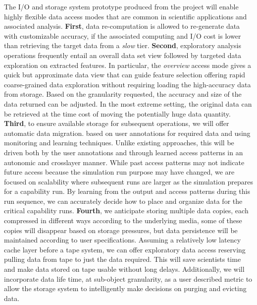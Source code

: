 \documentclass[11pt,letterpaper]{article}
\newcommand{\hasan}[1]{{\it \color{darkgreen} #1 -Hasan }}
\newcommand{\hasan}[1]{}
\begin{document}
The I/O and storage system prototype produced from the project will enable
highly flexible data access modes that are common in scientific applications
and associated analysis.
%
%
\textbf{First}, data re-computation is allowed to re-generate data with
customizable accuracy, if the associated computing and I/O cost is lower
than retrieving the target data from a {\em slow} tier.
%
\textbf{Second}, exploratory analysis operations frequently entail an
overall data set view followed by targeted data exploration on extracted
features.  In particular, the {\em overview} access mode gives a quick but
approximate data view that can guide feature selection offering rapid
coarse-grained data exploration without requiring loading the high-accuracy
data from storage. Based on the granularity requested, the accuracy and size
of the data returned can be adjusted. In the most extreme setting, the
original data can be retrieved at the time cost of moving the potentially
huge data quantity.
%
\textbf{Third}, to ensure available storage for subsequent operations, we
will offer automatic data migration. based on user annotations for required data and using monitoring and learning techniques.  Unlike existing approaches, this will be
driven both by the user annotations and through learned access patterns in
an autonomic and crosslayer manner.  While past access patterns may not
indicate future access because the simulation run purpose may have changed,
we are focused on scalability where subsequent runs are larger as the
simulation prepares for a capability run.  By learning from the output and
access patterns during this run sequence, we can accurately decide how to
place and organize data for the critical capability runs.
%
\textbf{Fourth}, we anticipate storing multiple data copies, each compressed
in different ways according to the underlying media, some of these copies
will disappear based on storage pressures, but data persistence will be
maintained according to user specifications. Assuming a relatively low
latency cache layer before a tape system, we can offer exploratory data
access reserving pulling data from tape to just the data required. This will
save scientists time and make data stored on tape usable without long
delays. Additionally, we will incorporate data life time, at sub-object
granularity, as a user described metric to allow the storage system to
intelligently make decisions on purging and evicting data. 
\end{document}

